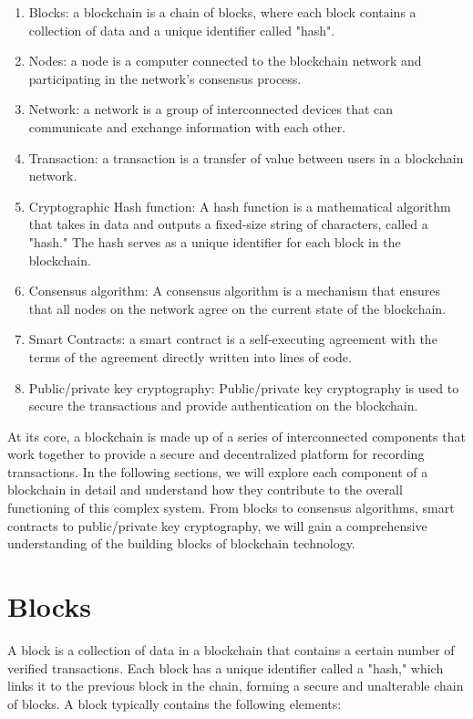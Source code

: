 \documentclass[target=mst,aauheader=]{thud}
\begin{document}
\begin{enumerate}

    \item Blocks: a blockchain is a chain of blocks, where each block contains a collection of data and a unique identifier called "hash".
    \item Nodes: a node is a computer connected to the blockchain network and participating in the network's consensus process.
    \item Network: a network is a group of interconnected devices that can communicate and exchange information with each other.
    \item Transaction: a transaction is a transfer of value between users in a blockchain network.
    \item Cryptographic Hash function: A hash function is a mathematical algorithm that takes in data and outputs a fixed-size string of characters, called a "hash." The hash serves as a unique identifier for each block in the blockchain.
    \item Consensus algorithm: A consensus algorithm is a mechanism that ensures that all nodes on the network agree on the current state of the blockchain.
    \item Smart Contracts: a smart contract is a self-executing agreement with the terms of the agreement directly written into lines of code.
    \item Public/private key cryptography: Public/private key cryptography is used to secure the transactions and provide authentication on the blockchain.

\end{enumerate}

    At its core, a blockchain is made up of a series of interconnected components that work together to provide a secure and decentralized platform for recording transactions. In the following sections, we will explore each component of a blockchain in detail and understand how they contribute to the overall functioning of this complex system. From blocks to consensus algorithms, smart contracts to public/private key cryptography, we will gain a comprehensive understanding of the building blocks of blockchain technology.

    \section{Blocks}
    
    A block is a collection of data in a blockchain that contains a certain number of verified transactions. Each block has a unique identifier called a "hash," which links it to the previous block in the chain, forming a secure and unalterable chain of blocks. A block typically contains the following elements:
        
\end{document}
